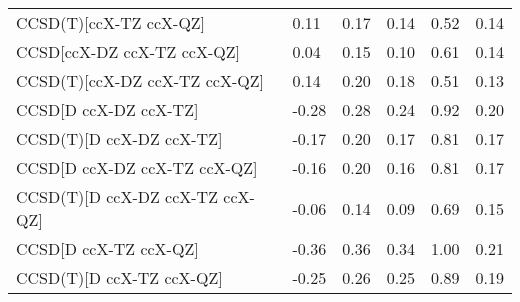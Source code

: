 \begin{table}
\begin{tabular}{l l l l l l }
    CCSD(T)[ccX-TZ ccX-QZ] & 0.11 & 0.17 & 0.14 & 0.52 & 0.14 \\ 
    CCSD[ccX-DZ ccX-TZ ccX-QZ] & 0.04 & 0.15 & 0.10 & 0.61 & 0.14 \\ 
    CCSD(T)[ccX-DZ ccX-TZ ccX-QZ] & 0.14 & 0.20 & 0.18 & 0.51 & 0.13 \\ 
    CCSD[D ccX-DZ ccX-TZ] & -0.28 & 0.28 & 0.24 & 0.92 & 0.20 \\ 
    CCSD(T)[D ccX-DZ ccX-TZ] & -0.17 & 0.20 & 0.17 & 0.81 & 0.17 \\ 
    CCSD[D ccX-DZ ccX-TZ ccX-QZ] & -0.16 & 0.20 & 0.16 & 0.81 & 0.17 \\ 
    CCSD(T)[D ccX-DZ ccX-TZ ccX-QZ] & -0.06 & 0.14 & 0.09 & 0.69 & 0.15 \\ 
    CCSD[D ccX-TZ ccX-QZ] & -0.36 & 0.36 & 0.34 & 1.00 & 0.21 \\ 
    CCSD(T)[D ccX-TZ ccX-QZ] & -0.25 & 0.26 & 0.25 & 0.89 & 0.19 \\ 
    \bottomrule
  \end{tabular}
\end{table}
